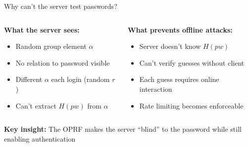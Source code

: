 \documentclass[aspectratio=169, lualatex, handout]{beamer}
\begin{document}
\begin{frame}{Why can't the server test passwords?}
	\begin{columns}[c]
		\begin{column}{0.5\textwidth}
			\textbf{What the server sees:}
			\begin{itemize}
				\item Random group element $\alpha$
				\item No relation to password visible
				\item Different $\alpha$ each login (random $r$)
				\item Can't extract $H(pw)$ from $\alpha$
			\end{itemize}
		\end{column}
		\begin{column}{0.5\textwidth}
			\textbf{What prevents offline attacks:}
			\begin{itemize}
				\item Server doesn't know $H(pw)$
				\item Can't verify guesses without client
				\item Each guess requires online interaction
				\item Rate limiting becomes enforceable
			\end{itemize}
		\end{column}
	\end{columns}
	\vspace{0.5cm}
	\begin{center}
		\textbf{Key insight:} The OPRF makes the server ``blind'' to the password while still enabling authentication
	\end{center}
\end{frame}
\end{document}
